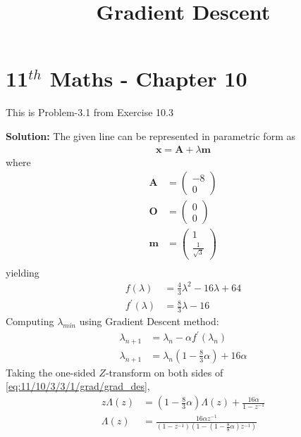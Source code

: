 \documentclass[12pt]{article}
\providecommand{\brak}[1]{\ensuremath{\left(#1\right)}}
\newcommand{\solution}{\noindent \textbf{Solution: }}
\newcommand{\myvec}[1]{\ensuremath{\begin{pmatrix}#1\end{pmatrix}}}
\let\vec\mathbf
\begin{document}
\begin{center}
\title{\textbf{Gradient Descent}}
\date{\vspace{-5ex}} %
\maketitle
\end{center}
\setcounter{page}{1}

\section{11$^{th}$ Maths - Chapter 10}
This is Problem-3.1 from Exercise 10.3 
\begin{enumerate}

\solution 
\fi
The given line  can be represented in parametric form as
\begin{align}
	\label{eq:11/10/3/3/1/grad/Eq2}
	\vec{x} = \vec{A}+\lambda\vec{m}
\end{align}
where
\begin{align}
	\vec{A} &= \myvec{-8 \\ 0}\\
	\vec{O} &= \myvec{ 0 \\ 0} \\
	\vec{m} &= \myvec{1 \\ \frac{1}{\sqrt{3}}} \\
\end{align}
 yielding 
\begin{align}
\label{eq:11/10/3/3/1/grad/Eq6}
	f\brak{\lambda} &= \frac{4}{3}\lambda^2-16\lambda+64 \\ 
	f^\prime\brak{\lambda} &= \frac{8}{3}\lambda - 16
\end{align}
Computing $\lambda_{min}$ using Gradient Descent method:
\begin{align}
	\lambda_{n+1} &= \lambda_n - \alpha f^\prime\brak{\lambda_n}\\
	\label{eq:11/10/3/3/1/grad/grad_des}
	\lambda_{n+1} &= \lambda_n\brak{1-\frac{8}{3}\alpha} + 16\alpha
\end{align}
Taking the one-sided $Z$-transform on both sides of \eqref{eq:11/10/3/3/1/grad/grad_des},
\begin{align}
            \label{eq:11/10/3/3/1/grad/Z-trans-eqn}
	    z\Lambda\brak{z} &= \brak{1-\frac{8}{3}\alpha}\Lambda\brak{z} + \frac{16\alpha}{1-z^{-1}} \\
	    \Lambda\brak{z} &= \frac{16\alpha z^{-1}}{\brak{1-z^{-1}}\brak{1-\brak{1-\frac{8}{8}\alpha}z^{-1}}} \\

\end{align}
\end{enumerate}
\end{document}
